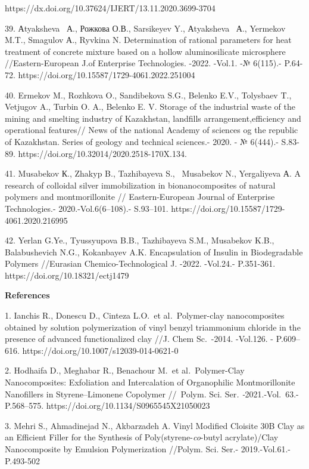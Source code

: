 https://dx.doi.org/10.37624/IJERT/13.11.2020.3699-3704

39. Аtyaksheva~ А., Рожкова О.В., Sarsikeyev Y., Аtyaksheva~ А.,
Yermekov M.T., Smagulov А., Ryvkina N. Determination of rational
parameters for heat treatment of concrete mixture based on a hollow
aluminosilicate microsphere //Eastern-European J.of Enterprise
Technologies. -2022. -Vol.1. -№ 6(115).- P.64-72.
https://doi.org/10.15587/1729-4061.2022.251004

40. Ermekov M., Rozhkova O., Sandibekova S.G., Belenko E.V., Tolysbaev
T., Vetjugov A., Turbin O. A., Belenko E. V. Storage of the industrial
waste of the mining and smelting industry of Kazakhstan, landfills
arrangement,efficiency and operational features// News of the national
Academy of sciences og the republic of Kazakhstan. Series of geology and
technical sciences.- 2020. - № 6(444).- S.83-89.
https://doi.org/10.32014/2020.2518-170X.134.

41. Musabekov К., Zhakyp B., Tazhibayeva S., ~Musabekov N., Yergaliyeva
А. A research of colloidal silver immobilization in bionanocomposites of
natural polymers and montmorillonite // Eastern-European Journal of
Enterprise Technologies.- 2020.-Vol.6(6--108).- S.93--101.
https://doi.org/10.15587/1729-4061.2020.216995

42. Yerlan G.Ye., Tyussyupova B.B., Tazhibayeva S.M., Musabekov K.B.,
Balabushevich N.G., Kokanbayev A.K. Encapsulation of Insulin in
Biodegradable Polymers //Eurasian Chemico-Technological J. -2022.
-Vol.24.- P.351-361. https://doi.org/10.18321/ectj1479

\textbf{References}

1. Ianchis R., Donescu D., Cinteza L.O.~et al\emph{.}~Polymer-clay
nanocomposites obtained by solution polymerization of vinyl benzyl
triammonium chloride in the presence of advanced functionalized clay
//J. Chem Sc.~-2014. -Vol.126. - P.609--616.
https://doi.org/10.1007/s12039-014-0621-0

2. Hodhaifa D., Meghabar R., Benachour M.~et al\emph{.}~Polymer-Clay
Nanocomposites: Exfoliation and Intercalation of Organophilic
Montmorillonite Nanofillers in Styrene--Limonene Copolymer //~Polym.
Sci. Ser\emph{. -}2021.-Vol.~63.- P.568--575.
https://doi.org/10.1134/S0965545X21050023

3. Mehri S., Ahmadinejad N., Akbarzadeh A. Vinyl Modified Cloisite 30B
Clay as an Efficient Filler for the Synthesis of
Poly(styrene-\emph{co}-butyl acrylate)/Clay Nanocomposite by Emulsion
Polymerization //Polym. Sci. Ser.- 2019.-Vol.61.-P.493-502

